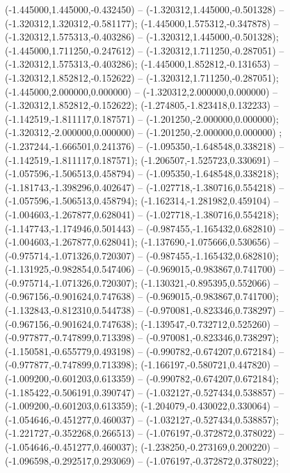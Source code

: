  (-1.445000,1.445000,-0.432450) -- (-1.320312,1.445000,-0.501328) -- (-1.320312,1.320312,-0.581177);
 (-1.445000,1.575312,-0.347878) -- (-1.320312,1.575313,-0.403286) -- (-1.320312,1.445000,-0.501328);
 (-1.445000,1.711250,-0.247612) -- (-1.320312,1.711250,-0.287051) -- (-1.320312,1.575313,-0.403286);
 (-1.445000,1.852812,-0.131653) -- (-1.320312,1.852812,-0.152622) -- (-1.320312,1.711250,-0.287051);
 (-1.445000,2.000000,0.000000) -- (-1.320312,2.000000,0.000000) -- (-1.320312,1.852812,-0.152622);
 (-1.274805,-1.823418,0.132233) -- (-1.142519,-1.811117,0.187571) -- (-1.201250,-2.000000,0.000000);
 (-1.320312,-2.000000,0.000000) -- (-1.201250,-2.000000,0.000000) ;
 (-1.237244,-1.666501,0.241376) -- (-1.095350,-1.648548,0.338218) -- (-1.142519,-1.811117,0.187571);
 (-1.206507,-1.525723,0.330691) -- (-1.057596,-1.506513,0.458794) -- (-1.095350,-1.648548,0.338218);
 (-1.181743,-1.398296,0.402647) -- (-1.027718,-1.380716,0.554218) -- (-1.057596,-1.506513,0.458794);
 (-1.162314,-1.281982,0.459104) -- (-1.004603,-1.267877,0.628041) -- (-1.027718,-1.380716,0.554218);
 (-1.147743,-1.174946,0.501443) -- (-0.987455,-1.165432,0.682810) -- (-1.004603,-1.267877,0.628041);
 (-1.137690,-1.075666,0.530656) -- (-0.975714,-1.071326,0.720307) -- (-0.987455,-1.165432,0.682810);
 (-1.131925,-0.982854,0.547406) -- (-0.969015,-0.983867,0.741700) -- (-0.975714,-1.071326,0.720307);
 (-1.130321,-0.895395,0.552066) -- (-0.967156,-0.901624,0.747638) -- (-0.969015,-0.983867,0.741700);
 (-1.132843,-0.812310,0.544738) -- (-0.970081,-0.823346,0.738297) -- (-0.967156,-0.901624,0.747638);
 (-1.139547,-0.732712,0.525260) -- (-0.977877,-0.747899,0.713398) -- (-0.970081,-0.823346,0.738297);
 (-1.150581,-0.655779,0.493198) -- (-0.990782,-0.674207,0.672184) -- (-0.977877,-0.747899,0.713398);
 (-1.166197,-0.580721,0.447820) -- (-1.009200,-0.601203,0.613359) -- (-0.990782,-0.674207,0.672184);
 (-1.185422,-0.506191,0.390747) -- (-1.032127,-0.527434,0.538857) -- (-1.009200,-0.601203,0.613359);
 (-1.204079,-0.430022,0.330064) -- (-1.054646,-0.451277,0.460037) -- (-1.032127,-0.527434,0.538857);
 (-1.221727,-0.352268,0.266513) -- (-1.076197,-0.372872,0.378022) -- (-1.054646,-0.451277,0.460037);
 (-1.238250,-0.273169,0.200220) -- (-1.096598,-0.292517,0.293069) -- (-1.076197,-0.372872,0.378022);
